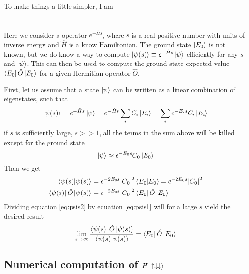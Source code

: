 \documentclass{article}
\begin{document}
To make things a little simpler, I am 


\section{}
Here we consider a operator $e^{-\hat{H}s}$, where $s$ is a real positive number with units of inverse energy and $\hat{H}$ is a know Hamiltonian. The ground state $\ket{E_0}$ is not known, but we do know a way to compute $\ket{\psi(s)}\equiv e^{-\hat{H}s}\ket{\psi}$ efficiently for any $s$ and $\ket{\psi}$. This can then be used to compute the ground state expected value  $\bra{E_0}\hat{O}\ket{E_0}$ for a given Hermitian operator $\hat{O}$.

First, let us assume that a state $\ket{\psi}$ can be written as a linear combination of eigenstates, such that
\begin{equation*}
\ket{\psi(s)}=e^{-\hat{H}s}\ket{\psi}=e^{-\hat{H}s}\sum_i C_i\ket{E_i}=\sum_i e^{-E_i s}C_i\ket{E_i}
\end{equation*}
if $s$ is sufficiently large, $s>>1$, all the terms in the sum above will be killed except for the ground state 
\begin{equation*}
\ket{\psi} \approx e^{-E_0s}C_0\ket{E_0}
\end{equation*}
Then we get
\begin{align}
\braket{\psi(s)} &= e^{-2E_0s}\abs{C_0}^2\braket{E_0}=e^{-2E_0s}\abs{C_0}^2 \label{eq:psis1} \\
\bra{\psi(s)}\hat{O}\ket{\psi(s)} &= e^{-2E_0s}\abs{C_0}^2\bra{E_0}\hat{O}\ket{E_0} \label{eq:psis2}
\end{align}
Dividing equation \ref{eq:psis2} by equation \ref{eq:psis1} will for a large $s$ yield the desired result
\begin{equation}
\lim_{s\to\infty}\frac{\bra{\psi(s)}\hat{O}\ket{\psi(s)}}{\braket{\psi(s)}}=\bra{E_0}\hat{O}\ket{E_0}
\end{equation}

\pagebreak
\begin{appendix}
\section{Numerical computation of $H\ket{\uparrow\downarrow\downarrow}$}
\label{app:updndn}


\end{appendix}
\end{document}
